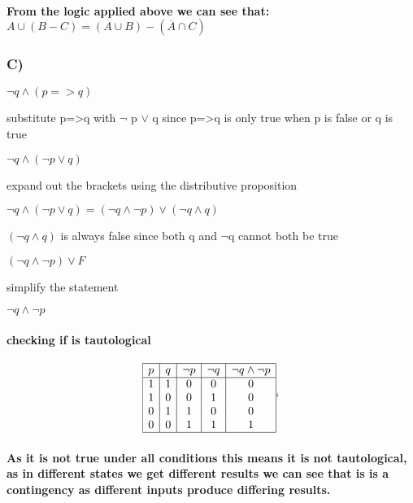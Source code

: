 \documentclass[english,10pt,a4paper]{report}
\begin{document}
\paragraph{From the logic applied above we can see that:\\ $A \cup (B-C) = (A \cup B) - (\overline{A} \cap C)$}

\subsubsection{C)}

$\neg q \wedge (p =>q)$

\begin{flushright}
	substitute p=>q with $\neg$ p $\vee$ q since p=>q is only true when p is false or q is true
\end{flushright}

$\neg q \wedge (\neg p\vee q)$


\begin{flushright}
	expand out the brackets using the distributive proposition
\end{flushright}
$ \neg q \wedge ( \neg p \vee q) = (\neg q\wedge \neg p ) \vee (\neg q \wedge q)$

\begin{flushright}
 	 $(\neg q \wedge q)$  is always false since both q and $\neg$q cannot both be true
\end{flushright}
$ (\neg q\wedge \neg p ) \vee F$

\begin{flushright}
	simplify the statement
\end{flushright}
$\neg q \wedge \neg  p$

\paragraph{
checking if is tautological}
\[
\begin{array}{|c|c|c|c|c|}
	\hline
	p & q & \neg p & \neg q & \neg q \wedge \neg p \\
	\hline
	1 & 1 & 0 & 0 & 0 \\
	1 & 0 & 0 & 1 & 0 \\
	0 & 1 & 1 & 0 & 0 \\
	0 & 0 & 1 & 1 & 1 \\
	\hline
\end{array}`
\]
	
\paragraph{As it is not true under all conditions this means it is not tautological, as in different states we get different results we can see that is is a contingency as different inputs produce differing results.}
\end{document}

